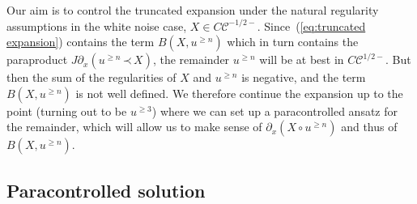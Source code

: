 \documentclass[a4paper,11pt]{article}
\newcommand{\CC}{\mathscr{C}}
\newcommand{\lpara}{\,\mathord{\prec}\,}
\newcommand{\reso}{\,\mathord{\circ}\,}
\begin{document}
Our aim is to control the truncated expansion under the natural regularity
assumptions in the white noise case, $X \in C \CC^{- 1 / 2 -}$.
Since~(\ref{eq:truncated expansion}) contains the term $B (X, u^{\geqslant
n})$ which in turn contains the paraproduct $J \partial_x (u^{\geqslant n}
\lpara X)$, the remainder $u^{\geqslant n}$ will be at best in $C \CC^{1 / 2
-}$. But then the sum of the regularities of $X$ and $u^{\geqslant n}$ is
negative, and the term $B (X, u^{\geqslant n})$ is not well defined. We
therefore continue the expansion up to the point (turning out to be
$u^{\geqslant 3}$) where we can set up a paracontrolled ansatz for the
remainder, which will allow us to make sense of $\partial_x (X \reso
u^{\geqslant n})$ and thus of $B (X, u^{\geqslant n})$.

\subsection{Paracontrolled solution}
\end{document}

